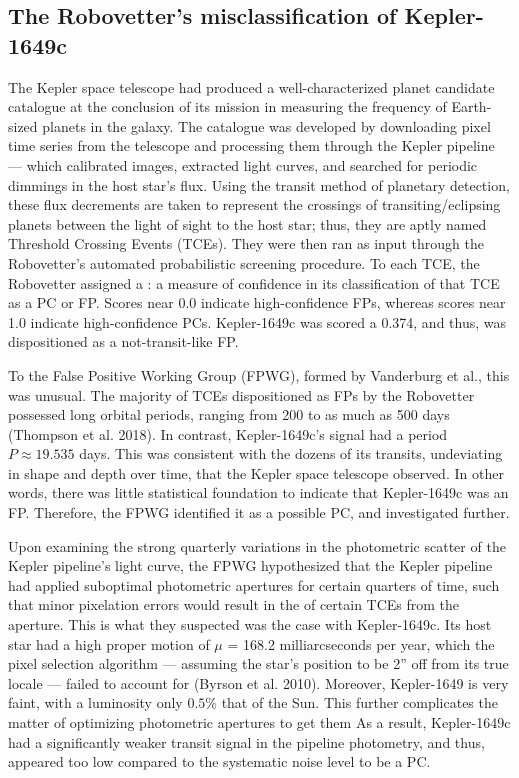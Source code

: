 \documentclass[onecolumn, 12pt]{article}
\begin{document}
\subsection{The Robovetter's misclassification of Kepler-1649c}

The Kepler space telescope had produced a well-characterized planet candidate catalogue at the conclusion of its mission in measuring the frequency of Earth-sized planets in the galaxy. The catalogue was developed by downloading pixel time series from the telescope and processing them through the Kepler pipeline — which calibrated images, extracted light curves, and searched for periodic dimmings in the host star's flux. Using the transit method of planetary detection, these flux decrements are taken to represent the crossings of transiting/eclipsing planets between the light of sight to the host star; thus, they are aptly named Threshold Crossing Events (TCEs). They were then ran as input through the Robovetter's automated probabilistic screening procedure. To each TCE, the Robovetter assigned a : a measure of confidence in its classification of that TCE as a PC or FP. Scores near 0.0 indicate high-confidence FPs, whereas scores near 1.0 indicate high-confidence PCs. Kepler-1649c was scored a 0.374, and thus, was dispositioned as a not-transit-like FP.

To the False Positive Working Group (FPWG), formed by Vanderburg et al., this was unusual. The majority of TCEs dispositioned as FPs by the Robovetter possessed long orbital periods, ranging from 200 to as much as 500 days (Thompson et al. 2018). In contrast, Kepler-1649c's signal had a period $P \approx 19.535$ days. This was consistent with the dozens of its transits, undeviating in shape and depth over time, that the Kepler space telescope observed. In other words, there was little statistical foundation to indicate that Kepler-1649c was an FP. Therefore, the FPWG identified it as a possible PC, and investigated further.

Upon examining the strong quarterly variations in the photometric scatter of the Kepler pipeline's light curve, the FPWG hypothesized that the Kepler pipeline had applied suboptimal photometric apertures for certain quarters of time, such that minor pixelation errors would result in the  of certain TCEs from the aperture. This is what they suspected was the case with Kepler-1649c. Its host star had a high proper motion of $\mu$ = 168.2 milliarcseconds per year, which the pixel selection algorithm — assuming the star's position to be 2'' off from its true locale — failed to account for (Byrson et al. 2010). Moreover, Kepler-1649 is very faint, with a luminosity only $0.5\%$ that of the Sun. This further complicates the matter of optimizing photometric apertures to get them  As a result, Kepler-1649c had a significantly weaker transit signal in the pipeline photometry, and thus, appeared too low compared to the systematic noise level to be a PC.
\end{document}
